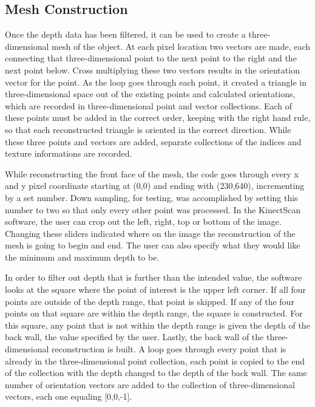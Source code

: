 \documentclass[pdftex,10.5pt]{report}
\begin{document}
\subsection{Mesh Construction}
Once the depth data has been filtered, it can be used to create a three-dimensional mesh of the object. At each pixel location two vectors are made, each connecting that three-dimensional point to the next point to the right and the next point below. Cross multiplying these two vectors results in the orientation vector for the point. As the loop goes through each point, it created a triangle in three-dimensional space out of the existing points and calculated orientations, which are recorded in three-dimensional point and vector collections. Each of these points must be added in the correct order, keeping with the right hand rule, so that each reconstructed triangle is oriented in the correct direction. While these three points and vectors are added, separate collections of the indices and texture informations are recorded. 

While reconstructing the front face of the mesh, the code goes through every x and y pixel coordinate starting at (0,0) and ending with (230,640), incrementing by a set number. Down sampling, for testing, was accomplished by setting this number to two so that only every other point was processed. In the KinectScan software, the user can crop out the left, right, top or bottom of the image. Changing these sliders indicated where on the image the reconstruction of the mesh is going to begin and end. The user can also specify what they would like the minimum and maximum depth to be. 

In order to filter out depth that is further than the intended value, the software looks at the square where the point of interest is the upper left corner.  If all four points are outside of the depth range, that point is skipped. If any of the four points on that square are within the depth range, the square is constructed. For this square, any point that is not within the depth range is given the depth of the back wall, the value specified by the user. Lastly, the back wall of the three-dimensional reconstruction is built. A loop goes through every point that is already in the three-dimensional point collection, each point is copied to the end of the collection with the depth changed to the depth of the back wall. The same number of orientation vectors are added to the collection of three-dimensional vectors, each one equaling [0,0,-1]. 
\cite{cite8}
\end{document}
